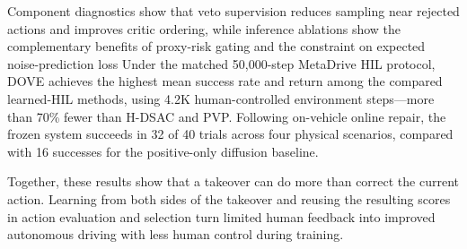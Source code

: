 \documentclass[9pt,journal]{IEEEtran}
\newcommand{\DOVE}{DOVE}
\newcommand{\CPCal}{\ensuremath{\mathrm{CPCal}}}
\newcommand{\ER}{\ensuremath{\mathrm{ER}}}
\begin{document}
Component diagnostics show that veto supervision reduces sampling near
rejected actions and improves critic ordering, while inference ablations
show the complementary benefits of proxy-risk gating and the
constraint on expected noise-prediction loss Under the matched 50{,}000-step MetaDrive HIL protocol, \DOVE{}
achieves the highest mean success rate  and return among
the compared learned-HIL methods, using 4.2K human-controlled environment
steps---more than 70\% fewer than H-DSAC and PVP. Following on-vehicle
online repair, the frozen system succeeds in 32 of 40 trials across four
physical scenarios, compared with 16 successes for the positive-only
diffusion baseline.

Together, these results show that a takeover can do more than correct
the current action. Learning from both sides of the takeover and reusing
the resulting scores in action evaluation and selection turn limited
human feedback into improved autonomous driving with less human control
during training.







\end{document}
